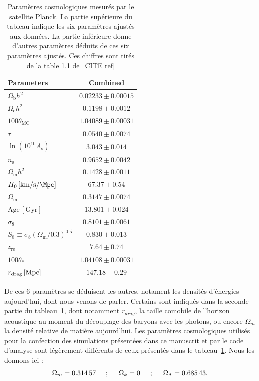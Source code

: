 \documentclass[11pt, twoside, a4paper, openright]{report}
\begin{document}
\begin{table}[h]
  \centering
  \caption{Paramètres cosmologiques mesurés par le satellite Planck. La partie supérieure du tableau indique les six paramètres ajustés aux données. La partie inférieure donne d'autres paramètres déduits de ces six paramètres ajustés. Ces chiffres sont tirés de la table 1.1 de~\ref{CITE ref}}
  \label{table:planck2018}
  \begin{tabular}{lc}
    \toprule
    Parameters & Combined \\
    \midrule
    $\Omega_{\mathrm{b}}h^2$\dotfill & $0.02233\pm0.00015$ \\
    $\Omega_{\mathrm{c}}h^2$\dotfill & $0.1198\pm0.0012$ \\
    $100\theta_{\mathrm{MC}}$\dotfill & $1.04089\pm0.00031$ \\
    $\tau$\dotfill & $0.0540\pm0.0074$ \\
    $\ln(10^{10}A_\mathrm{s})$\dotfill & $3.043\pm0.014$ \\
    $n_\mathrm{s}$\dotfill & $0.9652\pm0.0042$ \\
    \midrule
    $\Omega_{\mathrm{m}} h^2$\dotfill & $ 0.1428\pm 0.0011 $ \\
    $H_0 \,[\si{\kilo\meter\per\second\per\Mpc}]$\dotfill & $67.37\pm0.54$ \\
    $\Omega_{\mathrm{m}}$\dotfill & $0.3147\pm0.0074$ \\
    $\mathrm{Age}\, [\mathrm{Gyr}]$\dotfill  & $13.801\pm0.024$ \\
    $\sigma_8$\dotfill & $0.8101\pm0.0061$ \\
    $S_8\equiv \sigma_8 (\Omega_{\mathrm{m}}/0.3)^{0.5}$\dotfill & $0.830\pm0.013$ \\
    $z_{\mathrm{re}}$\dotfill & $7.64\pm0.74$ \\
    $100\theta_\ast$\dotfill & $1.04108\pm0.00031$ \\
    $r_{\mathrm{drag}} \,[{\rm Mpc}]$\dotfill & $147.18\pm0.29$ \\
    \bottomrule
  \end{tabular}
\end{table}

De ces 6 paramètres se déduisent les autres, notament les densités d'énergies aujourd'hui, dont nous venons de parler. Certains sont indiqués dans la seconde partie du tableau~\ref{table:planck2018},
dont notamment $r_{drag}$, la taille comobile de l'horizon acoustique au moment du découplage des baryons avec les photons,
ou encore $\Omega_m$ la densité relative de matière aujourd'hui. Les paramètres cosmologiques utilisés pour la confection des simulations présentées dans ce manuscrit et par le code d'analyse \picca{} sont légèrement différents de ceux présentés dans le tableau~\ref{table:planck2018}. Nous les donnons ici :
\begin{equation}
  \label{eq:par_cosmo}
  \Omega_m = \num{0.31457} \hspace{0.5cm} ; \hspace{0.5cm} \Omega_k = \num{0} \hspace{0.5cm} ; \hspace{0.5cm} \Omega_{\Lambda} = \num{0.68543} .
\end{equation}
\end{document}
